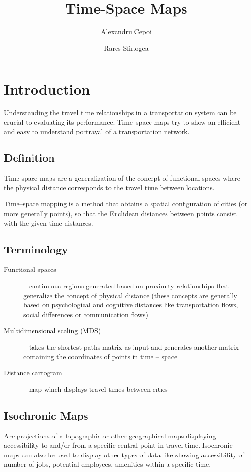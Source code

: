 \documentclass[a4paper,11pt]{article}
\title{Time-Space Maps}
\author{Alexandru Cepoi}
\author{Rares Sfirlogea}
\affil{Utrecht University}
\begin{document}
\maketitle

\section{Introduction}
Understanding the travel time relationships in a transportation system can be crucial
to evaluating its performance. Time--space maps try to show an efficient and easy to
understand portrayal of a transportation network.

\subsection{Definition}
Time space maps are a generalization of the concept of functional spaces where the
physical distance corresponds to the travel time between locations.

Time--space mapping is a method that obtains a spatial configuration of cities (or more
generally points), so that the Euclidean distances between points consist with the given time distances.

\subsection{Terminology}
\begin{description}
    \item[Functional spaces] -- continuous regions generated based on proximity relationships
that generalize the concept of physical distance (these concepts are generally based
on psychological and cognitive distances like transportation flows, social differences
or communication flows)
    \item[Multidimensional scaling (MDS)] -- takes the shortest paths matrix as input and
generates another matrix containing the coordinates of points in time – space
    \item[Distance cartogram] -- map which displays travel times between cities
\end{description}

\subsection{Isochronic Maps}
Are projections of a topographic or other geographical maps displaying accessibility to and/or from a specific central point in travel time. Isochronic maps can also be used to display other types of data like showing accessibility of
number of jobs, potential employees, amenities within a specific time.
\end{document}
